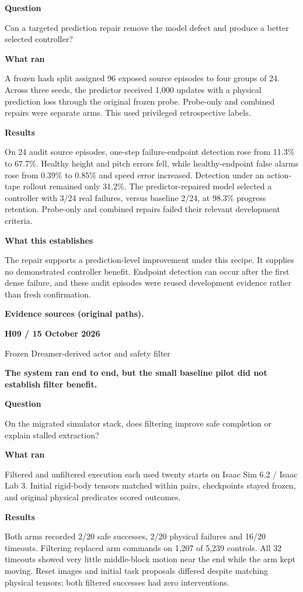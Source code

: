\documentclass[11pt,a4paper]{article}
\newcommand{\block}[2]{\par\textbf{\color{ink}#1}\par\nopagebreak #2\par}
\newcommand{\finding}[1]{\begin{tcolorbox}[colback=pale,colframe=pale,boxrule=0pt,arc=1mm,left=10pt,right=10pt,top=10pt,bottom=10pt]\color{ink}\large\bfseries #1\end{tcolorbox}}
\begin{document}
\block{Question}{Can a targeted prediction repair remove the model defect and produce a better selected controller?}
\block{What ran}{A frozen hash split assigned 96 exposed source episodes to four groups of 24. Across three seeds, the predictor received 1,000 updates with a physical prediction loss through the original frozen probe. Probe-only and combined repairs were separate arms. This used privileged retrospective labels.}
\block{Results}{On 24 audit source episodes, one-step failure-endpoint detection rose from 11.3\% to 67.7\%. Healthy height and pitch errors fell, while healthy-endpoint false alarms rose from 0.39\% to 0.85\% and speed error increased. Detection under an action-tape rollout remained only 31.2\%. The predictor-repaired model selected a controller with 3/24 real failures, versus baseline 2/24, at 98.3\% progress retention. Probe-only and combined repairs failed their relevant development criteria.}
\block{What this establishes}{The repair supports a prediction-level improvement under this recipe. It supplies no demonstrated controller benefit. Endpoint detection can occur after the first dense failure, and these audit episodes were reused development evidence rather than fresh confirmation.}
\vfill{\footnotesize\color{muted}\textbf{Evidence sources (original paths).}\par
\raggedright {}}
\clearpage
{}\label{exp:H09}
{\color{accent}\small\bfseries H09 / 15 October 2026}\par
{}\par
{\color{muted}\small Frozen Dreamer-derived actor and safety filter}\par\vspace{2mm}
\finding{The system ran end to end, but the small baseline pilot did not establish filter benefit.}
\block{Question}{On the migrated simulator stack, does filtering improve safe completion or explain stalled extraction?}
\block{What ran}{Filtered and unfiltered execution each used twenty starts on Isaac Sim 6.2 / Isaac Lab 3. Initial rigid-body tensors matched within pairs, checkpoints stayed frozen, and original physical predicates scored outcomes.}
\block{Results}{Both arms recorded 2/20 safe successes, 2/20 physical failures and 16/20 timeouts. Filtering replaced arm commands on 1,207 of 5,239 controls. All 32 timeouts showed very little middle-block motion near the end while the arm kept moving. Reset images and initial task proposals differed despite matching physical tensors; both filtered successes had zero interventions.}
\end{document}
